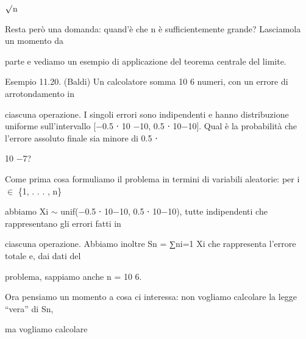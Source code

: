 \documentclass[a4paper,portrait,12pt]{article}
\begin{document}
\begin{flushleft}
$\surd$n
\end{flushleft}


\begin{flushleft}
Resta per\`{o} una domanda: quand'\`{e} che n \`{e} sufficientemente grande? Lasciamola un momento da
\end{flushleft}


\begin{flushleft}
parte e vediamo un esempio di applicazione del teorema centrale del limite.
\end{flushleft}


\begin{flushleft}
Esempio 11.20. (Baldi) Un calcolatore somma 10 6 numeri, con un errore di arrotondamento in
\end{flushleft}


\begin{flushleft}
ciascuna operazione. I singoli errori sono indipendenti e hanno distribuzione uniforme sull'intervallo [$-$0.5 ⋅ 10 $-$10, 0.5 ⋅ 10$-$10]. Qual \`{e} la probabilit\`{a} che l'errore assoluto finale sia minore di 0.5 ⋅
\end{flushleft}


10 $-$7?


\begin{flushleft}
Come prima cosa formuliamo il problema in termini di variabili aleatorie: per i $\in$ \{1, . . . , n\}
\end{flushleft}


\begin{flushleft}
abbiamo Xi $\sim$ unif($-$0.5 ⋅ 10$-$10, 0.5 ⋅ 10$-$10), tutte indipendenti che rappresentano gli errori fatti in
\end{flushleft}


\begin{flushleft}
ciascuna operazione. Abbiamo inoltre Sn = ∑ni=1 Xi che rappresenta l'errore totale e, dai dati del
\end{flushleft}


\begin{flushleft}
problema, sappiamo anche n = 10 6.
\end{flushleft}


\begin{flushleft}
Ora pensiamo un momento a cosa ci interessa: non vogliamo calcolare la legge {``}vera'' di Sn,
\end{flushleft}


\begin{flushleft}
ma vogliamo calcolare
\end{flushleft}
\end{document}
